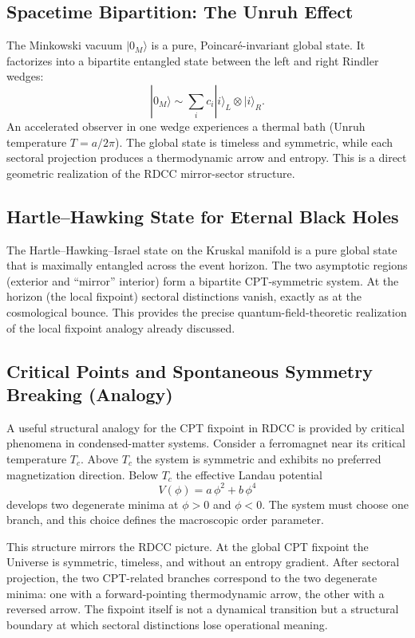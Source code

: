 \documentclass[11pt,a4paper]{article}
\begin{document}
\subsection{Spacetime Bipartition: The Unruh Effect}

The Minkowski vacuum $|0_M\rangle$ is a pure, Poincaré-invariant global state. It factorizes into a bipartite entangled state between the left and right Rindler wedges:
\[
|0_M\rangle \sim \sum_i c_i |i\rangle_L \otimes |i\rangle_R.
\]
An accelerated observer in one wedge experiences a thermal bath (Unruh temperature $T = a/2\pi$). The global state is timeless and symmetric, while each sectoral projection produces a thermodynamic arrow and entropy. This is a direct geometric realization of the RDCC mirror-sector structure.

\subsection{Hartle--Hawking State for Eternal Black Holes}

The Hartle--Hawking–Israel state on the Kruskal manifold is a pure global state that is maximally entangled across the event horizon. The two asymptotic regions (exterior and “mirror” interior) form a bipartite CPT-symmetric system. At the horizon (the local fixpoint) sectoral distinctions vanish, exactly as at the cosmological bounce. This provides the precise quantum-field-theoretic realization of the local fixpoint analogy already discussed.

\subsection{Critical Points and Spontaneous Symmetry Breaking (Analogy)}

A useful structural analogy for the CPT fixpoint in RDCC is provided by critical phenomena in condensed-matter systems. Consider a ferromagnet near its critical temperature $T_{c}$. Above $T_{c}$ the system is symmetric and exhibits no preferred magnetization direction. Below $T_{c}$ the effective Landau potential
\begin{equation}
    V(\phi) = a\,\phi^{2} + b\,\phi^{4}
\end{equation}
develops two degenerate minima at $\phi>0$ and $\phi<0$. The system must choose one branch, and this choice defines the macroscopic order parameter.

This structure mirrors the RDCC picture. At the global CPT fixpoint the Universe is symmetric, timeless, and without an entropy gradient. After sectoral projection, the two CPT-related branches correspond to the two degenerate minima: one with a forward-pointing thermodynamic arrow, the other with a reversed arrow. The fixpoint itself is not a dynamical transition but a structural boundary at which sectoral distinctions lose operational meaning.
\end{document}

